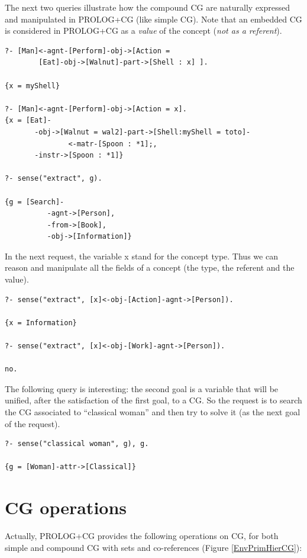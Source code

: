 \documentclass{book}
\begin{document}
The next two queries illustrate how the compound CG are naturally
expressed and manipulated in PROLOG+CG (like simple CG). Note that an
embedded CG is considered in PROLOG+CG as a {\it value} of the
concept ({\it not as a referent}).


\begin{verbatim}
?- [Man]<-agnt-[Perform]-obj->[Action = 
        [Eat]-obj->[Walnut]-part->[Shell : x] ].

{x = myShell}

?- [Man]<-agnt-[Perform]-obj->[Action = x].
{x = [Eat]-
       -obj->[Walnut = wal2]-part->[Shell:myShell = toto]-
               <-matr-[Spoon : *1];,
       -instr->[Spoon : *1]}

?- sense("extract", g).

{g = [Search]-
          -agnt->[Person],
          -from->[Book],
          -obj->[Information]}
\end{verbatim}


In the next request, the variable x stand for the concept
type. Thus we can reason and manipulate all the fields of a concept
(the type, the referent and the value).


\begin{verbatim}
?- sense("extract", [x]<-obj-[Action]-agnt->[Person]).

{x = Information}

?- sense("extract", [x]<-obj-[Work]-agnt->[Person]).

no.
\end{verbatim}


The following query is interesting: the second goal is a variable that
will be unified, after the satisfaction of the first goal, to a CG. So
the request is to search the CG associated to ``classical woman'' and
then try to solve it (as the next goal of the request).


\begin{verbatim}
?- sense("classical woman", g), g.

{g = [Woman]-attr->[Classical]}
\end{verbatim}


\section{CG operations}\label{Sec:CGOps}

Actually, PROLOG+CG provides the following operations on CG, for both
simple and compound CG with sets and co-references (Figure
\ref{EnvPrimHierCG}):
\end{document}
